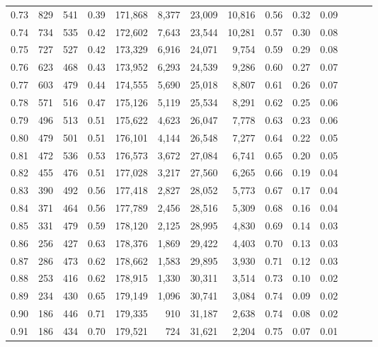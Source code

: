 \begin{tabular}{rrrrrrrrrrrrrr}
0.73 &    829 &  541 &  0.39 &  171,868 &    8,377 &  23,009 &  10,816 &  0.56 &  0.32 &      0.09 \\
0.74 &    734 &  535 &  0.42 &  172,602 &    7,643 &  23,544 &  10,281 &  0.57 &  0.30 &      0.08 \\
0.75 &    727 &  527 &  0.42 &  173,329 &    6,916 &  24,071 &   9,754 &  0.59 &  0.29 &      0.08 \\
0.76 &    623 &  468 &  0.43 &  173,952 &    6,293 &  24,539 &   9,286 &  0.60 &  0.27 &      0.07 \\
0.77 &    603 &  479 &  0.44 &  174,555 &    5,690 &  25,018 &   8,807 &  0.61 &  0.26 &      0.07 \\
0.78 &    571 &  516 &  0.47 &  175,126 &    5,119 &  25,534 &   8,291 &  0.62 &  0.25 &      0.06 \\
0.79 &    496 &  513 &  0.51 &  175,622 &    4,623 &  26,047 &   7,778 &  0.63 &  0.23 &      0.06 \\
0.80 &    479 &  501 &  0.51 &  176,101 &    4,144 &  26,548 &   7,277 &  0.64 &  0.22 &      0.05 \\
0.81 &    472 &  536 &  0.53 &  176,573 &    3,672 &  27,084 &   6,741 &  0.65 &  0.20 &      0.05 \\
0.82 &    455 &  476 &  0.51 &  177,028 &    3,217 &  27,560 &   6,265 &  0.66 &  0.19 &      0.04 \\
0.83 &    390 &  492 &  0.56 &  177,418 &    2,827 &  28,052 &   5,773 &  0.67 &  0.17 &      0.04 \\
0.84 &    371 &  464 &  0.56 &  177,789 &    2,456 &  28,516 &   5,309 &  0.68 &  0.16 &      0.04 \\
0.85 &    331 &  479 &  0.59 &  178,120 &    2,125 &  28,995 &   4,830 &  0.69 &  0.14 &      0.03 \\
0.86 &    256 &  427 &  0.63 &  178,376 &    1,869 &  29,422 &   4,403 &  0.70 &  0.13 &      0.03 \\
0.87 &    286 &  473 &  0.62 &  178,662 &    1,583 &  29,895 &   3,930 &  0.71 &  0.12 &      0.03 \\
0.88 &    253 &  416 &  0.62 &  178,915 &    1,330 &  30,311 &   3,514 &  0.73 &  0.10 &      0.02 \\
0.89 &    234 &  430 &  0.65 &  179,149 &    1,096 &  30,741 &   3,084 &  0.74 &  0.09 &      0.02 \\
0.90 &    186 &  446 &  0.71 &  179,335 &      910 &  31,187 &   2,638 &  0.74 &  0.08 &      0.02 \\
0.91 &    186 &  434 &  0.70 &  179,521 &      724 &  31,621 &   2,204 &  0.75 &  0.07 &      0.01 \\

\end{tabular}
